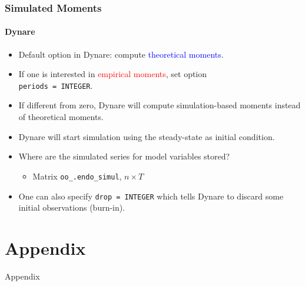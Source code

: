 \documentclass{beamer}
\begin{document}
\begin{frame}
\frametitle{Simulated Moments}
\framesubtitle{Dynare}
\small 
\begin{itemize}
	\item Default option in Dynare: compute \textcolor{blue}{theoretical moments}.
	\item If one is interested in \textcolor{red}{empirical moments}, set option\\ \texttt{periods = INTEGER}. 
	\item If different from zero, Dynare will compute simulation-based moments instead of theoretical moments.
	\item Dynare will start simulation using the steady-state as initial condition.
	\item Where are the simulated series for model variables stored?
	\begin{itemize}
		\item Matrix \texttt{oo\_.endo\_simul}, $ n \times T $
	\end{itemize}
    \item One can also specify \texttt{drop = INTEGER} which tells Dynare to discard some initial observations (burn-in).
\end{itemize}
\end{frame}

 \setcounter{framenumbervorappendix}{%
	\value{framenumber}}

\section{Appendix}


\begin{frame}
\begin{center}
	{\LARGE Appendix}
\end{center}
\end{frame}
\end{document}
